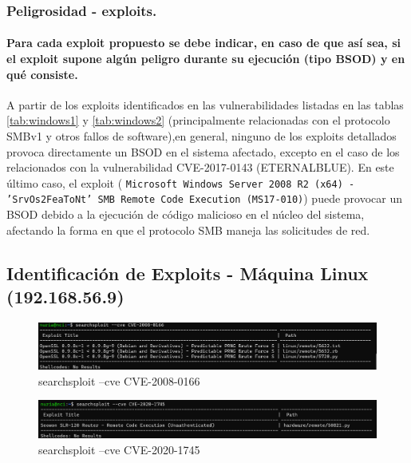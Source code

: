 \documentclass[a4paper,12pt]{article} %
\begin{document}
\subsubsection{Peligrosidad - exploits.}

\paragraph{Para cada exploit propuesto se debe indicar, en caso de que así sea, si el exploit supone algún peligro durante su ejecución (tipo BSOD) y en qué consiste.}


A partir de los exploits identificados en las vulnerabilidades listadas en las tablas \ref{tab:windows1} y \ref{tab:windows2} (principalmente relacionadas con el protocolo SMBv1 y otros fallos de software),en general, ninguno de los exploits detallados provoca directamente un BSOD en el sistema afectado, excepto en el caso de los relacionados con la vulnerabilidad CVE-2017-0143 (ETERNALBLUE). En este último caso, el exploit ( \texttt{Microsoft Windows Server 2008 R2 (x64) - ’SrvOs2FeaToNt’ SMB Remote Code Execution (MS17-010)}) puede provocar un BSOD debido a la ejecución de código malicioso en el núcleo del sistema, afectando la forma en que el protocolo SMB maneja las solicitudes de red.

\newpage

 \subsection{Identificación de Exploits - Máquina Linux (192.168.56.9)}

            \begin{figure} [hp!]
             \centering
             \includegraphics[width=1\textwidth]{imagenes/cvelinux1.png}
             \caption{ searchsploit --cve  CVE-2008-0166}
             \label{fig:linux1}
            \end{figure}

            \begin{figure} [hp!]
             \centering
             \includegraphics[width=1\textwidth]{imagenes/cvelinux2.png}
             \caption{ searchsploit --cve CVE-2020-1745}
             \label{fig:linux2}
            \end{figure}
\end{document}
